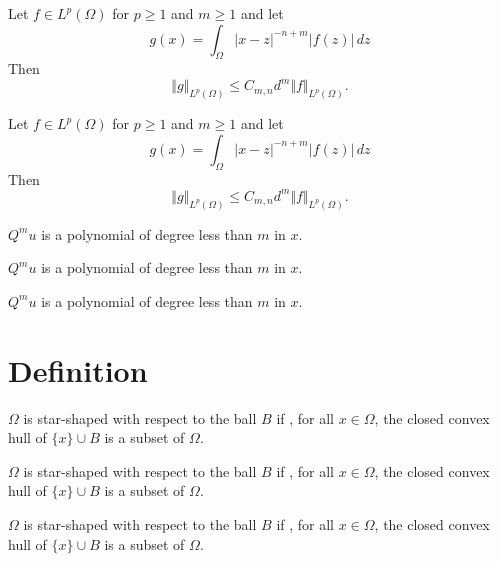 \documentclass{article}
\begin{document}
\begin{lemma}[xxx]
    Let $f \in L^p(\Omega)$ for $p \ge 1$ and $m \ge 1$ and let
    \[
        g(x) = \int_\Omega |x-z|^{-n+m} |f(z)|\,dz
    \]
    Then
    \begin{equation*}
        \Vert g \Vert_{L^p(\Omega)} \le C_{m,n} d^m \Vert f\Vert_{L^p(\Omega)}.
    \end{equation*}
\end{lemma}

\begin{lemma*}
    Let $f \in L^p(\Omega)$ for $p \ge 1$ and $m \ge 1$ and let
    \[
        g(x) = \int_\Omega |x-z|^{-n+m} |f(z)|\,dz
    \]
    Then
    \begin{equation*}
        \Vert g \Vert_{L^p(\Omega)} \le C_{m,n} d^m \Vert f\Vert_{L^p(\Omega)}.
    \end{equation*}
\end{lemma*}

\begin{claim}
    $Q^m u$ is a polynomial of degree less than $m$ in $x$.
\end{claim}

\begin{claim}[xxx]
    $Q^m u$ is a polynomial of degree less than $m$ in $x$.
\end{claim}

\begin{claim*}
    $Q^m u$ is a polynomial of degree less than $m$ in $x$.
\end{claim*}

\section{Definition}

\begin{definition}
    $\Omega$ is star-shaped with respect to the ball $B$ if , for all $x \in \Omega$, the closed convex hull of $\{x\} \cup B$ is a subset of $\Omega$.
\end{definition}

\begin{definition}[xxx]
    $\Omega$ is star-shaped with respect to the ball $B$ if , for all $x \in \Omega$, the closed convex hull of $\{x\} \cup B$ is a subset of $\Omega$.
\end{definition}

\begin{definition*}
    $\Omega$ is star-shaped with respect to the ball $B$ if , for all $x \in \Omega$, the closed convex hull of $\{x\} \cup B$ is a subset of $\Omega$.
\end{definition*}
\end{document}
